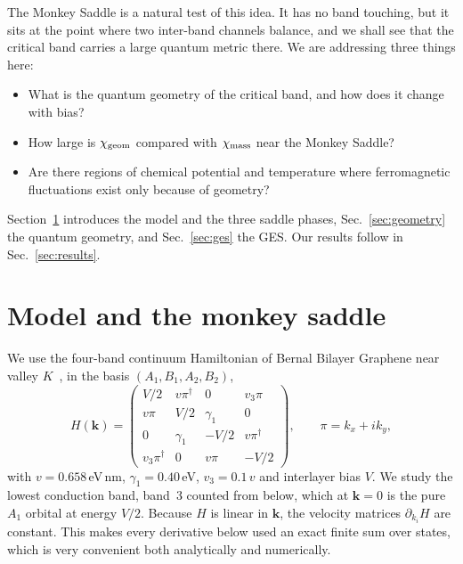 \documentclass[11pt,a4paper]{article}
\numberwithin{equation}{section}
\newcommand{\bk}{\mathbf{k}}
\newcommand{\chig}{\chi_{\rm geom}}
\newcommand{\chim}{\chi_{\rm mass}}
\begin{document}
The Monkey Saddle is a natural test of this idea. It has no band touching, but it sits at the point where two inter-band channels balance, and we shall see that the critical band carries a large quantum metric there. We are addressing three things here:

\begin{itemize}
    \item What is the quantum geometry of the critical band, and how does it change with bias?
    \item How large is $\chig$ compared with $\chim$ near the Monkey Saddle?
    \item Are there regions of chemical potential and temperature where ferromagnetic fluctuations exist only because of geometry?

\end{itemize}

Section~\ref{sec:model} introduces the model and the three saddle phases, Sec.~\ref{sec:geometry} the quantum geometry, and Sec.~\ref{sec:ges} the GES. Our results follow in Sec.~\ref{sec:results}.
    
\section{Model and the monkey saddle}\label{sec:model}

We use the four-band continuum Hamiltonian of Bernal Bilayer Graphene near valley $K$~\cite{McCann2013}, in the basis $(A_1,B_1,A_2,B_2)$, 
\begin{equation}
H(\bk)=\begin{pmatrix}
V/2 & v\pi^\dagger & 0 & v_3\pi\\
v\pi & V/2 & \gamma_1 & 0\\
0 & \gamma_1 & -V/2 & v\pi^\dagger\\
v_3\pi^\dagger & 0 & v\pi & -V/2
\end{pmatrix},\qquad \pi=k_x+ik_y,
\label{eq:H}
\end{equation}
with $v=0.658\,$eV\,nm, $\gamma_1=0.40\,$eV, $v_3=0.1\,v$ and interlayer bias $V$. We study the lowest conduction band, band~3 counted from below, which at $\bk=0$ is the pure $A_1$ orbital
at energy $V/2$. Because $H$ is linear in $\bk$, the velocity matrices $\partial_{k_i}H$ are constant. This makes every derivative below used an exact finite sum over states, which is very convenient both analytically and numerically.\\
\end{document}
